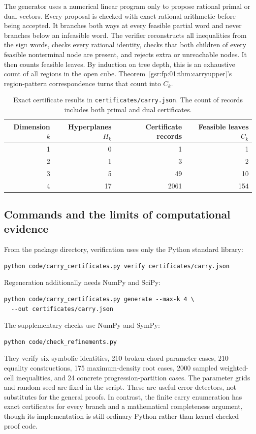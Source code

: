 \documentclass[11pt,letterpaper]{article}
\numberwithin{equation}{section}
\theoremstyle{definition}
\theoremstyle{remark}
\newcommand{\1}{\mathbf 1}
\newcommand{\code}[1]{\texttt{\small #1}}
\begin{document}
The generator uses a numerical linear program only to propose rational
primal or dual vectors. Every proposal is checked with exact rational
arithmetic before being accepted. It branches both ways at every feasible
partial word and never branches below an infeasible word. The verifier
reconstructs all inequalities from the sign words, checks every rational
identity, checks that both children of every feasible nonterminal node
are present, and rejects extra or unreachable nodes. It then counts
feasible leaves. By induction on tree depth, this is an exhaustive count
of all regions in the open cube. Theorem~\ref{gsr:fp:01:thm:carryupper}'s
region-pattern correspondence turns that count into $C_k$.

\begin{table}[htbp]
\centering
\begin{tabular}{rrrr}
\toprule
Dimension $k$ & Hyperplanes $H_k$ & Certificate records & Feasible leaves $C_k$\\
\midrule
1 & 0 & 1 & 1\\
2 & 1 & 3 & 2\\
3 & 5 & 49 & 10\\
4 & 17 & 2061 & 154\\
\bottomrule
\end{tabular}
\caption{Exact certificate results in \code{certificates/carry.json}.
The count of records includes both primal and dual certificates.}
\label{gsr:fp:01:tab:certificates}
\end{table}

\subsection{Commands and the limits of computational evidence}
From the package directory, verification uses only the Python standard
library:
\begin{verbatim}
python code/carry_certificates.py verify certificates/carry.json
\end{verbatim}
Regeneration additionally needs NumPy and SciPy:
\begin{verbatim}
python code/carry_certificates.py generate --max-k 4 \
  --out certificates/carry.json
\end{verbatim}
The supplementary checks use NumPy and SymPy:
\begin{verbatim}
python code/check_refinements.py
\end{verbatim}
They verify six symbolic identities, 210 broken-chord parameter cases,
210 equality constructions, 175 maximum-density root cases, 2000 sampled
weighted-cell inequalities, and 24 concrete progression-partition cases.
The parameter grids and random seed are fixed in the script.
These are useful error detectors, not substitutes for the general proofs.
In contrast, the finite carry enumeration has exact certificates for every
branch and a mathematical completeness argument, though its implementation
is still ordinary Python rather than kernel-checked proof code.
\end{document}
